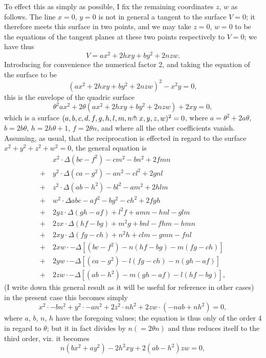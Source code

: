 \documentclass[11pt,a4paper]{article}
\begin{document}
To effect this as simply as possible, I fix the remaining coordinates $z$, $w$ as follows. The line $x=0$, $y=0$ is not in general a tangent to the surface $V=0$; it therefore meets this surface in two points, and we may take $z=0$, $w=0$ to be the equations of the tangent planes at these two points respectively to $V=0$; we have thus
\[
V = ax^{2} + 2hxy + by^{2} + 2nzw.
\]
Introducing for convenience the numerical factor 2, and taking the equation of the surface to be
\[
(ax^{2} + 2hxy + by^{2} + 2nzw)^{2} - x^{2}y = 0,
\]
this is the envelope of the quadric surface
\[
\theta^{2} ax^{2} + 2\theta(ax^{2} + 2hxy + by^{2} + 2nzw) + 2xy = 0,
\]
which is a surface $(a,b,c,d,f,g,h,l,m,n\hspace{-0.2em}\pitchfork x,y,z,w)^{2} = 0$, where $a=\theta^{2} + 2a\theta$, $b=2b\theta$, $h=2h\theta+1$, $f=2\theta n$, and where all the other coefficients vanish. Assuming, as usual, that the reciprocation is effected in regard to the surface $x^{2} + y^{2} + z^{2} + w^{2} = 0$, the general equation is
\begin{align*}
&x^{2} \cdot \Delta(bc - f^{2}) - cm^{2} - bn^{2} + 2fmn\\
+\ &y^{2} \cdot \Delta(ca - g^{2}) - an^{2} - cl^{2} + 2gnl\\
+\ &z^{2} \cdot \Delta(ab - h^{2}) - bl^{2} - am^{2} + 2hlm\\
+\ &w^{2} \cdot \Delta abc - af^{2} - bg^{2} - ch^{2} + 2fgh\\
+\ &2yz \cdot \Delta(gh - af) + l^{2}f + amn - hnl - glm\\
+\ &2zx \cdot \Delta(hf - bg) + m^{2}g + bnl - fhm - hmn\\
+\ &2xy \cdot \Delta(fg - ch) + n^{2}h + clm - gmn - fnl\\
+\ &2xw \cdot -\Delta\!\left[(bc-f^{2}) - n(hf-bg) - m(fg-ch)\right]\\
+\ &2yw \cdot -\Delta\!\left[(ca-g^{2}) - l(fg-ch) - n(gh-af)\right]\\
+\ &2zw \cdot -\Delta\!\left[(ab-h^{2}) - m(gh-af) - l(hf-bg)\right],
\end{align*}
(I write down this general result as it will be useful for reference in other cases) in the present case this becomes simply
\[
x^{2} \cdot -bn^{2} + y^{2} \cdot -an^{2} + 2z^{2} \cdot nh^{2} + 2zw \cdot (-nab + nh^{2}) = 0,
\]
where $a$, $b$, $n$, $h$ have the foregoing values; the equation is thus only of the order 4 in regard to $\theta$; but it in fact divides by $n (= 2\theta n)$ and thus reduces itself to the third order, viz. it becomes
\[
n(bx^{2} + ay^{2}) - 2h^{2}xy + 2(ab - h^{2})zw = 0,
\]
\end{document}

